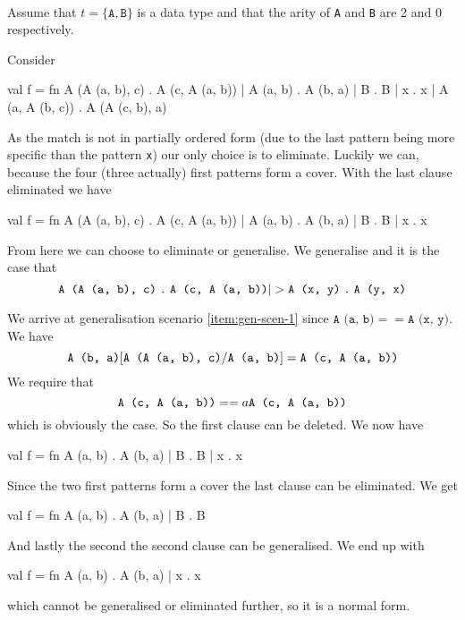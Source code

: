 \begin{example}\ \\
Assume that $t = \{\texttt{A}, \texttt{B}\}$ is a data type and that the arity
of \texttt{A} and \texttt{B} are 2 and 0 respectively.

Consider
\begin{sml}
val f =
fn A (A (a, b), c) . A (c, A (a, b))
 | A (a, b)        . A (b, a)
 | B               . B
 | x               . x
 | A (a, A (b, c)) . A (A (c, b), a)
\end{sml}
As the match is not in partially ordered form (due to the last pattern being
more specific than the pattern \texttt{x}) our only choice is to
eliminate. Luckily we can, because the four (three actually) first patterns
form a cover. With the last clause eliminated we have

\begin{sml}
val f =
fn A (A (a, b), c) . A (c, A (a, b))
 | A (a, b)        . A (b, a)
 | B               . B
 | x               . x
\end{sml}

From here we can choose to eliminate or generalise. We generalise and it is the
case that
\[
\clause{\texttt{A (A (a, b), c)}}{\texttt{A (c, A (a, b))}}
|>
\clause{\texttt{A (x, y)}}{\texttt{A (y, x)}}
\]

We arrive at generalisation scenario \ref{item:gen-scen-1} since $\texttt{A (a, b)} ==
\texttt{A (x, y)}$. We have
\[
\texttt{A (b, a)}[\texttt{A (A (a, b), c)}/\texttt{A (a, b)}] = \texttt{A (c, A (a, b))}
\]
We require that
\[
\texttt{A (c, A (a, b))}
==a
\texttt{A (c, A (a, b))}
\]
which is obviously the case. So the first clause can be deleted. We now have

\begin{sml}
val f =
fn A (a, b) . A (b, a)
 | B        . B
 | x        . x
\end{sml}

Since the two first patterns form a cover the last clause can be eliminated. We
get

\begin{sml}
val f =
fn A (a, b) . A (b, a)
 | B        . B
\end{sml}

And lastly the second the second clause can be generalised. We end up with

\begin{sml}
val f =
fn A (a, b) . A (b, a)
 | x        . x
\end{sml}

which cannot be generalised or eliminated further, so it is a normal form.
\end{example}


